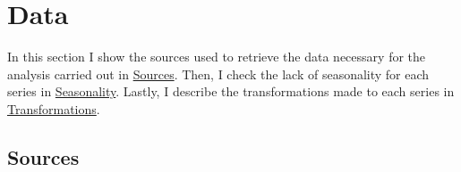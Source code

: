 \documentclass[12pt,twoside]{reedthesis}
\begin{document}
\hypertarget{data}{%
\chapter{Data}\label{data}}

In this section I show the sources used to retrieve the data necessary for the analysis carried out in \protect\hyperlink{sources}{Sources}. Then, I check the lack of seasonality for each series in \protect\hyperlink{seasonality}{Seasonality}. Lastly, I describe the transformations made to each series in \protect\hyperlink{transformations}{Transformations}.

\hypertarget{sources}{%
\section{Sources}\label{sources}}
\end{document}
